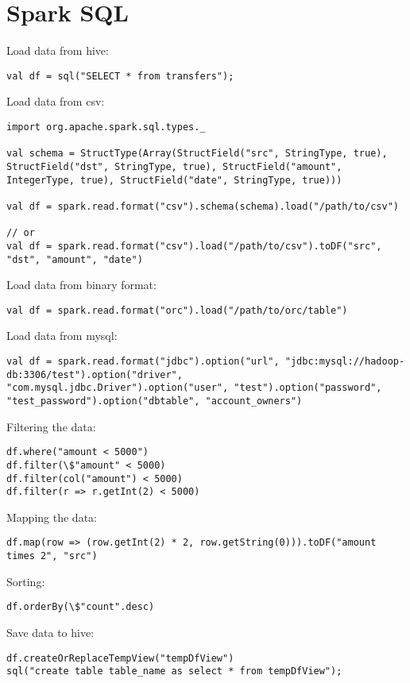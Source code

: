\documentclass{article}
\begin{document}
\section*{Spark SQL}

Load data from hive:
\begin{lstlisting}[]
val df = sql("SELECT * from transfers");
\end{lstlisting}

Load data from csv:
\begin{lstlisting}[]
import org.apache.spark.sql.types._

val schema = StructType(Array(StructField("src", StringType, true), StructField("dst", StringType, true), StructField("amount", IntegerType, true), StructField("date", StringType, true)))

val df = spark.read.format("csv").schema(schema).load("/path/to/csv")

// or
val df = spark.read.format("csv").load("/path/to/csv").toDF("src", "dst", "amount", "date")
\end{lstlisting}

Load data from binary format:
\begin{lstlisting}[]
val df = spark.read.format("orc").load("/path/to/orc/table")
\end{lstlisting}

Load data from mysql:
\begin{lstlisting}[]
val df = spark.read.format("jdbc").option("url", "jdbc:mysql://hadoop-db:3306/test").option("driver", "com.mysql.jdbc.Driver").option("user", "test").option("password", "test_password").option("dbtable", "account_owners")
\end{lstlisting}

Filtering the data:
\begin{lstlisting}[]
df.where("amount < 5000")
df.filter(\$"amount" < 5000)
df.filter(col("amount") < 5000)
df.filter(r => r.getInt(2) < 5000)
\end{lstlisting}

Mapping the data:
\begin{lstlisting}[]
df.map(row => (row.getInt(2) * 2, row.getString(0))).toDF("amount times 2", "src")
\end{lstlisting}

Sorting:
\begin{lstlisting}[]
df.orderBy(\$"count".desc)
\end{lstlisting}

Save data to hive:
\begin{lstlisting}[]
df.createOrReplaceTempView("tempDfView")
sql("create table table_name as select * from tempDfView");
\end{lstlisting}
\end{document}
